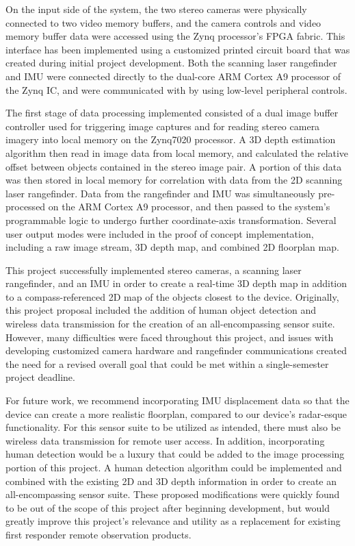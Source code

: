 \par
On the input side of the system, the two stereo cameras were physically connected to two video memory buffers, and the camera controls and video memory buffer data were accessed using the Zynq processor's FPGA fabric. This interface has been implemented using a customized printed circuit board that was created during initial project development. Both the scanning laser rangefinder and IMU were connected directly to the dual-core ARM Cortex A9 processor of the Zynq IC, and were communicated with by using low-level peripheral controls. 
\par
The first stage of data processing implemented consisted of a dual image buffer controller used for triggering image captures and for reading stereo camera imagery into local memory on the Zynq7020 processor. A 3D depth estimation algorithm then read in image data from local memory, and calculated the relative offset between objects contained in the stereo image pair. A portion of this data was then stored in local memory for correlation with data from the 2D scanning laser rangefinder. Data from the rangefinder and IMU was simultaneously pre-processed on the ARM Cortex A9 processor, and then passed to the system's programmable logic to undergo further coordinate-axis transformation. Several user output modes were included in the proof of concept implementation, including a raw image stream, 3D depth map, and combined 2D floorplan map.  
\par
This project successfully implemented stereo cameras, a scanning laser rangefinder, and an IMU in order to create a real-time 3D depth map in addition to a compass-referenced 2D map of the objects closest to the device. Originally, this project proposal included the addition of human object detection and wireless data transmission for the creation of an all-encompassing sensor suite. However, many difficulties were faced throughout this project, and issues with developing customized camera hardware and rangefinder communications created the need for a revised overall goal that could be met within a single-semester project deadline.
\par
For future work, we recommend incorporating IMU displacement data so that the device can create a more realistic floorplan, compared to our device's radar-esque functionality. For this sensor suite to be utilized as intended, there must also be wireless data transmission for remote user access. In addition, incorporating human detection would be a luxury that could be added to the image processing portion of this project. A human detection algorithm could be implemented and combined with the existing 2D and 3D depth information in order to create an all-encompassing sensor suite. These proposed modifications were quickly found to be out of the scope of this project after beginning development, but would greatly improve this project's relevance and utility as a replacement for existing first responder remote observation products.
